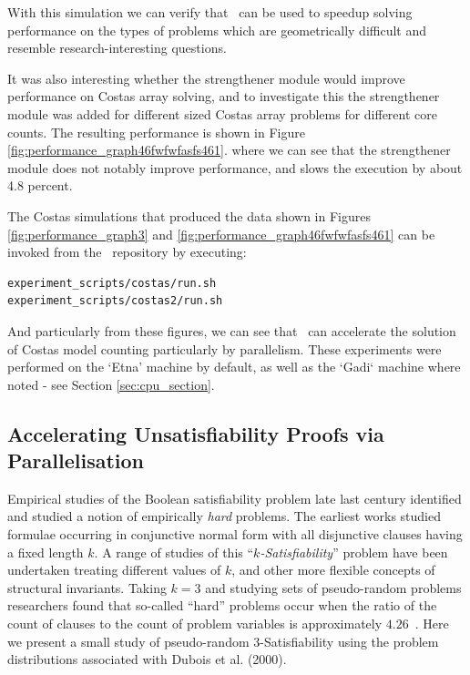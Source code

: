 \documentclass[
10pt, %
a4paper, %
oneside, %
headinclude,footinclude, %
BCOR5mm, %
]{scrartcl}
\begin{document}
With this simulation we can verify that \dagster\ can be used to speedup solving performance on the types of problems which are geometrically difficult and resemble research-interesting questions.



It was also interesting whether the strengthener module would improve performance on Costas array solving, and to investigate this the strengthener module was added for different sized Costas array problems for different core counts.
The resulting performance is shown in Figure \ref{fig:performance_graph46fwfwfasfs461}. where we can see that the strengthener module does not notably improve performance, and slows the execution by about 4.8 percent.




The Costas simulations that produced the data shown in Figures \ref{fig:performance_graph3} and \ref{fig:performance_graph46fwfwfasfs461} can be invoked from the \dagster\ repository by executing:
\begin{Verbatim}[frame=single]
experiment_scripts/costas/run.sh
experiment_scripts/costas2/run.sh
\end{Verbatim}
And particularly from these figures, we can see that \dagster\ can accelerate the solution of Costas model counting particularly by parallelism. These experiments were performed on the `Etna' machine by default, as well as the `Gadi` machine where noted - see Section \ref{sec:cpu_section}.

\subsection{Accelerating Unsatisfiability Proofs via Parallelisation}\label{section:gensat_problems}

Empirical studies of the Boolean satisfiability problem late last century identified and studied a notion of empirically {\em hard} problems.
The earliest works studied formulae occurring in conjunctive normal form with all disjunctive clauses having a fixed length $k$.
A range of studies of this ``{\em $k$-Satisfiability}'' problem have been undertaken treating different values of $k$, and other more flexible concepts of structural invariants.
Taking $k=3$ and studying sets of pseudo-random problems researchers found that so-called ``hard'' problems occur when the ratio of the count of clauses to the count of problem variables is approximately $4.26$~\cite{cheeseman:etal:1991}. 
Here we present a small study of pseudo-random $3$-Satisfiability using the problem distributions associated with Dubois et al. (2000)\cite{dubois:etal:2000}.
\end{document}
